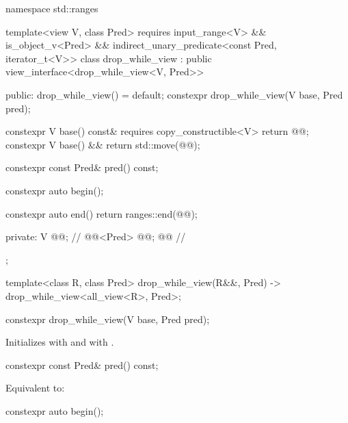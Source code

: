 %
%
%
\begin{codeblock}
namespace std::ranges {
  template<view V, class Pred>
  requires input_range<V> && is_object_v<Pred> &&
    indirect_unary_predicate<const Pred, iterator_t<V>>
  class drop_while_view : public view_interface<drop_while_view<V, Pred>> {
  public:
    drop_while_view() = default;
    constexpr drop_while_view(V base, Pred pred);

    constexpr V base() const& requires copy_constructible<V> { return @@; }
    constexpr V base() && { return std::move(@@); }

    constexpr const Pred& pred() const;

    constexpr auto begin();

    constexpr auto end()
    { return ranges::end(@@); }

  private:
    V @@;                                            // \expos
    @@<Pred> @@; @\itcorr[-1]@                       // \expos
  };

  template<class R, class Pred>
    drop_while_view(R&&, Pred) -> drop_while_view<all_view<R>, Pred>;
}
\end{codeblock}

%
\begin{itemdecl}
constexpr drop_while_view(V base, Pred pred);
\end{itemdecl}

\begin{itemdescr}
\pnum
\effects
Initializes  with  and
 with .
\end{itemdescr}

%
\begin{itemdecl}
constexpr const Pred& pred() const;
\end{itemdecl}

\begin{itemdescr}
\pnum
\effects
Equivalent to: 
\end{itemdescr}

%
\begin{itemdecl}
constexpr auto begin();
\end{itemdecl}

